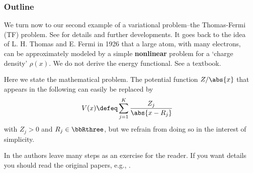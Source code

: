 \documentclass[openany, a4paper, oneside]{jsbook}
\begin{document}
\subsubsection{Outline}

We turn now to our second example of a variational problem--the Thomas-Fermi (TF) problem.
See \cite{LiebSimon1} for details and further developments.
It goes back to the idea of L. H. Thomas and E. Fermi in 1926 that a large atom,
with many electrons, can be approximately modeled by a simple \textbf{nonlinear} problem for a
`charge density' $\rho (x)$.
We do not derive the energy functional.
See a textbook.

Here we state the mathematical problem.
The potential function $Z / \abs{x}$ that appears in the following can easily be replaced by
\begin{align}
 V (x)
 \defeq
 \sum_{j=1}^{K} \frac{Z_j}{\abs{x - R_j}}
\end{align}
with $Z_j > 0$ and $R_j \in \bbRthree$, but we refrain from doing so in the interest of simplicity.

In \cite{LiebLoss1} the authors leave many steps as an exercise for the reader.
If you want details you should read the original papers, e.g., \cite{LiebSimon1}.
\end{document}
